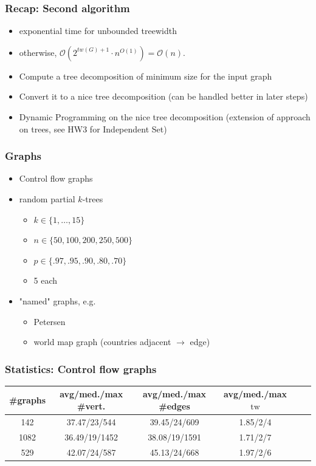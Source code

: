\documentclass[11pt]{beamer}
\DeclareMathOperator{\tw}{tw}
\begin{document}
\begin{frame}
\frametitle{Recap: Second algorithm}

\begin{itemize}
\item exponential time for unbounded treewidth
\item otherwise, $\mathcal{O}(2^{tw(G)+1} \cdot n^{O(1)}) = \mathcal{O}(n)$.

\item Compute a tree decomposition of minimum size for the input graph
\item Convert it to a nice tree decomposition (can be handled better in later steps)
\item Dynamic Programming on the nice tree decomposition (extension of approach on trees, see HW3 for Independent Set)
\end{itemize}

\end{frame}


\begin{frame}
\frametitle{Graphs}

\begin{itemize}
\item Control flow graphs
\item random partial $k$-trees 
\begin{itemize}
\item $k \in \{1, \dots, 15\}$
\item $n \in \{50,100,200,250,500\}$
\item $p \in \{.97, .95, .90, .80, .70\}$ 
\item 5 each
\end{itemize}
\item "named" graphs, e.g.
\begin{itemize}
\item Petersen 
\item world map graph (countries adjacent  $\rightarrow$ edge)
\end{itemize}
\end{itemize}
\end{frame}



\begin{frame}
\frametitle{Statistics: Control flow graphs}

\begin{center}
\footnotesize
\begin{table}[h!]
\centering
\begin{tabular}{|c|c|c|c|c|c|}
\hline
\#graphs & avg/med./max \#vert. & avg/med./max \#edges & avg/med./max $\tw$ \\
\hline \hline
142 & 37.47/23/544 & 39.45/24/609 & 1.85/2/4 \\
\hline
1082 & 36.49/19/1452 & 38.08/19/1591 & 1.71/2/7 \\
\hline
529 & 42.07/24/587 & 45.13/24/668 & 1.97/2/6 \\
\hline
\end{tabular}
\label{stat_CFGs}
\end{table}
\end{center}

\end{frame}
\end{document}
